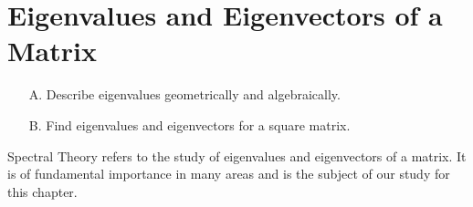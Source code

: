 \section{Eigenvalues and Eigenvectors of a Matrix}

\begin{outcome}
\begin{enumerate}
\item[A.] Describe eigenvalues geometrically and algebraically.

\item[B.] Find eigenvalues and eigenvectors for a square matrix.
\end{enumerate}
\end{outcome}

Spectral Theory refers to the study of eigenvalues and eigenvectors of a
matrix. It is of fundamental importance in many areas and is the subject of our study 
for this chapter.